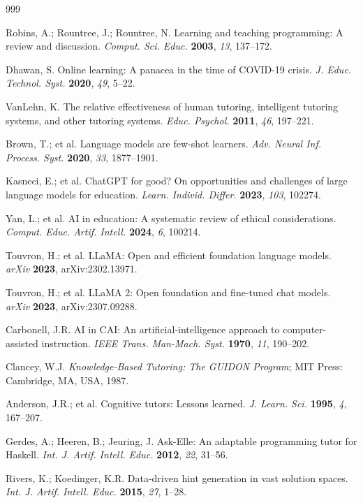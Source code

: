 \documentclass[applsci,article,submit,pdftex,moreauthors]{Definitions/mdpi}
\begin{document}
\begin{thebibliography}{999}

Robins, A.; Rountree, J.; Rountree, N. Learning and teaching programming: A review and discussion. \textit{Comput. Sci. Educ.} \textbf{2003}, \textit{13}, 137--172.

Dhawan, S. Online learning: A panacea in the time of COVID-19 crisis. \textit{J. Educ. Technol. Syst.} \textbf{2020}, \textit{49}, 5--22.

VanLehn, K. The relative effectiveness of human tutoring, intelligent tutoring systems, and other tutoring systems. \textit{Educ. Psychol.} \textbf{2011}, \textit{46}, 197--221.

Brown, T.; et al. Language models are few-shot learners. \textit{Adv. Neural Inf. Process. Syst.} \textbf{2020}, \textit{33}, 1877--1901.

Kasneci, E.; et al. ChatGPT for good? On opportunities and challenges of large language models for education. \textit{Learn. Individ. Differ.} \textbf{2023}, \textit{103}, 102274.

Yan, L.; et al. AI in education: A systematic review of ethical considerations. \textit{Comput. Educ. Artif. Intell.} \textbf{2024}, \textit{6}, 100214.

Touvron, H.; et al. LLaMA: Open and efficient foundation language models. \textit{arXiv} \textbf{2023}, arXiv:2302.13971.

Touvron, H.; et al. LLaMA 2: Open foundation and fine-tuned chat models. \textit{arXiv} \textbf{2023}, arXiv:2307.09288.

Carbonell, J.R. AI in CAI: An artificial-intelligence approach to computer-assisted instruction. \textit{IEEE Trans. Man-Mach. Syst.} \textbf{1970}, \textit{11}, 190--202.

Clancey, W.J. \textit{Knowledge-Based Tutoring: The GUIDON Program}; MIT Press: Cambridge, MA, USA, 1987.

Anderson, J.R.; et al. Cognitive tutors: Lessons learned. \textit{J. Learn. Sci.} \textbf{1995}, \textit{4}, 167--207.

Gerdes, A.; Heeren, B.; Jeuring, J. Ask-Elle: An adaptable programming tutor for Haskell. \textit{Int. J. Artif. Intell. Educ.} \textbf{2012}, \textit{22}, 31--56.

Rivers, K.; Koedinger, K.R. Data-driven hint generation in vast solution spaces. \textit{Int. J. Artif. Intell. Educ.} \textbf{2015}, \textit{27}, 1--28.


\end{thebibliography}
\end{document}
